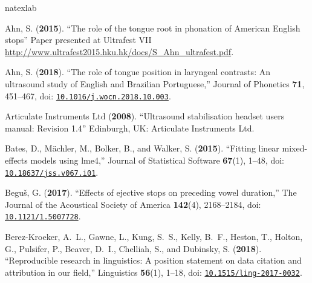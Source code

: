 \documentclass[preprint]{JASAnew}
\begin{document}
\begin{thebibliography}{66}
\def\enquote#1{``#1,''}
\def\plainquote#1{``#1''}
\expandafter\ifx\csname natexlab\endcsname\relax\def\natexlab#1{#1}\fi
\providecommand{\dourl}[1]{\href{http://#1}{\nolinkurl{#1}}}
\providecommand{\bibinfo}[2]{#2}
\providecommand{\noopsort}[1]{}
\providecommand{\switchargs}[2]{#2#1}
  \def\eatspace #1{#1}
\providecommand{\dodoi}[1]{doi: \href{http://dx.doi.org/#1}{\nolinkurl{#1}}}

\bibinfo{author}{Ahn, S.} (\textbf{\bibinfo{year}{2015}}).
  \plainquote{\bibinfo{title}{The role of the tongue root in phonation of
  {A}merican {E}nglish stops}} \bibinfo{howpublished}{Paper presented at
  Ultrafest VII
  \url{http://www.ultrafest2015.hku.hk/docs/S_Ahn_ultrafest.pdf}}.

\bibinfo{author}{Ahn, S.} (\textbf{\bibinfo{year}{2018}}).
  \enquote{\bibinfo{title}{The role of tongue position in laryngeal contrasts:
  An ultrasound study of {E}nglish and {B}razilian {P}ortuguese}}
  \bibinfo{journal}{Journal of Phonetics} \textbf{71},
  \bibinfo{pages}{451--467}, \dodoi{10.1016/j.wocn.2018.10.003}.

\bibinfo{author}{{Articulate Instruments Ltd{\texttrademark}}}
  (\textbf{\bibinfo{year}{2008}}). \plainquote{\bibinfo{title}{Ultrasound
  stabilisation headset users manual: Revision 1.4}}
  \bibinfo{howpublished}{Edinburgh, UK: Articulate Instruments Ltd}.

\bibinfo{author}{Bates, D.}, \bibinfo{author}{M{\"a}chler, M.},
  \bibinfo{author}{Bolker, B.},  and \bibinfo{author}{Walker, S.}
  (\textbf{\bibinfo{year}{2015}}). \enquote{\bibinfo{title}{Fitting linear
  mixed-effects models using lme4}} \bibinfo{journal}{Journal of Statistical
  Software} \textbf{67}(1), \bibinfo{pages}{1--48},
  \dodoi{10.18637/jss.v067.i01}.

\bibinfo{author}{Begu{\v s}, G.} (\textbf{\bibinfo{year}{2017}}).
  \enquote{\bibinfo{title}{Effects of ejective stops on preceding vowel
  duration}} \bibinfo{journal}{The Journal of the Acoustical Society of
  America} \textbf{142}(4), \bibinfo{pages}{2168--2184},
  \dodoi{10.1121/1.5007728}.

\bibinfo{author}{Berez-Kroeker, A.~L.}, \bibinfo{author}{Gawne, L.},
  \bibinfo{author}{Kung, S.~S.}, \bibinfo{author}{Kelly, B.~F.},
  \bibinfo{author}{Heston, T.}, \bibinfo{author}{Holton, G.},
  \bibinfo{author}{Pulsifer, P.}, \bibinfo{author}{Beaver, D.~I.},
  \bibinfo{author}{Chelliah, S.},  and \bibinfo{author}{Dubinsky, S.}
  (\textbf{\bibinfo{year}{2018}}). \enquote{\bibinfo{title}{Reproducible
  research in linguistics: A position statement on data citation and
  attribution in our field}} \bibinfo{journal}{Linguistics} \textbf{56}(1),
  \bibinfo{pages}{1--18}, \dodoi{10.1515/ling-2017-0032}.


\end{thebibliography}
\end{document}
